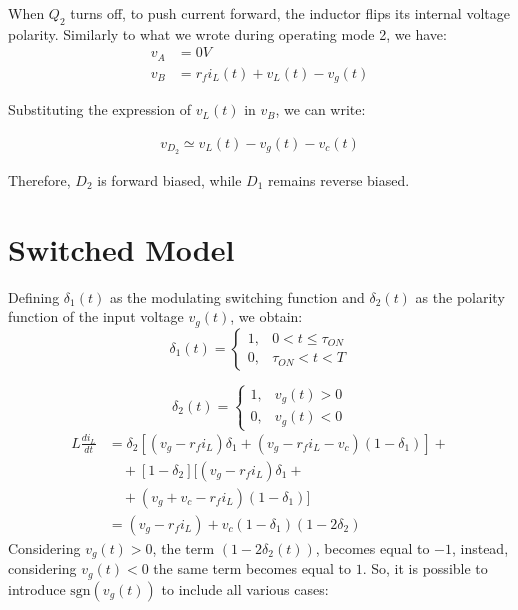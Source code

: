 \documentclass[DIV=calc, paper=a4, fontsize=11pt, twocolumn]{scrartcl}	 %
\begin{document}
When $Q_2$ turns off, to push current forward, the inductor flips its internal voltage polarity. Similarly to what we wrote during operating mode 2, we have:
\begin{subequations}\begin{align}
    v_A &= 0V \\
    v_B &= r_fi_L(t)+ v_L(t) - v_g(t)
\end{align}\end{subequations}

Substituting the expression of $v_L(t)$ in $v_B$, we can write:

\begin{align}
    v_{D_2} \simeq v_L(t) - v_g(t) - v_c(t) 
\end{align}

Therefore, $D_2$ is forward biased, while $D_1$ remains reverse biased.

\section {Switched Model}
Defining $\delta_1(t)$ as the modulating switching function and $\delta_2(t)$ as the polarity function of the input voltage $v_g(t)$, we obtain:
\[
\delta_1(t) = \begin{cases} 
1, & 0 < t \le \tau_{ON} \\ 
0, & \tau_{ON} < t < T 
\end{cases}
\]

\[
\delta_2(t) = \begin{cases} 
1, & v_g(t) > 0 \\ 
0, & v_g(t) < 0 
\end{cases}
\]
{\small
\begin{equation}
\begin{aligned}
L \frac{di_L}{dt} &= \delta_2 \left[ (v_g - r_f i_L)\delta_1 + (v_g - r_f i_L - v_c)(1 - \delta_1) \right] + \\
&\quad + [1 - \delta_2][(v_g - r_f i_L)\delta_1 + \\
&\quad + (v_g + v_c - r_f i_L)(1 - \delta_1)] \\[10pt]
&= (v_g - r_f i_L) + v_c(1 - \delta_1)(1 - 2\delta_2)
\end{aligned}
\end{equation}
}
Considering $v_g(t)>0$, the term $(1 - 2\delta_2(t))$, becomes equal to $-1$, instead, considering $v_g(t)<0$ the same term becomes equal to $1$. So, it is possible to introduce $\text{sgn}(v_g(t))$ to include all various cases:
\end{document}
